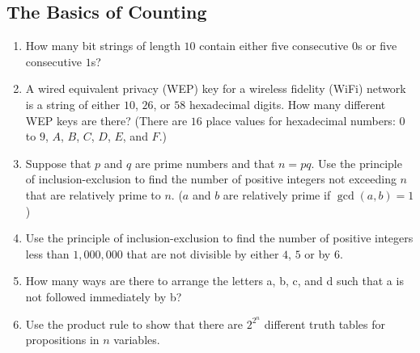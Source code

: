 \documentclass{../../cls/sig-alternate-05-2015}
\begin{document}
\subsection{The Basics of Counting}
\begin{enumerate}
    \item How many bit strings of length $10$ contain either five consecutive
    $0$s or five consecutive $1$s?

    \item A wired equivalent privacy (WEP) key for a wireless fidelity
    (WiFi) network is a string of either $10$, $26$, or $58$
    hexadecimal digits. How many different WEP keys are
    there? (There are
    $16$ place values for hexadecimal numbers: $0$ to $9$, $A$, $B$, $C$, $D$, $E$, and $F$.)

    \item Suppose that $p$ and $q$ are prime numbers and that $n = pq$.
    Use the principle of inclusion-exclusion to find the number
    of positive integers not exceeding $n$ that are relatively
    prime to $n$. ($a$ and $b$ are relatively prime if $\gcd(a,b)=1$)
    
    \item Use the principle of inclusion-exclusion to find the number
    of positive integers less than $1,000,000$ that are not
    divisible by either $4$, $5$ or by $6$.
    
    \item How many ways are there to arrange the letters a, b, c,
    and d such that a is not followed immediately by b?
    
    \item Use the product rul{\tiny }e to show that there are $2^{2^n}$
    different truth tables for propositions in $n$ variables.

\end{enumerate}
\end{document}
